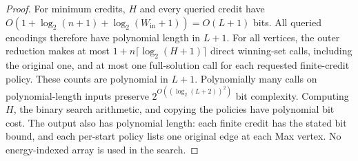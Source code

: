 \begin{proof}
For minimum credits, $H$ and every queried credit have
$O(1+\log_2(n+1)+\log_2(W_{\mathrm{in}}+1))=O(L+1)$ bits. All queried
encodings therefore have polynomial length in $L+1$. For all vertices,
the outer reduction makes at most $1+n\lceil\log_2(H+1)\rceil$ direct
winning-set calls, including the original one, and at most one
full-solution call for each requested finite-credit policy. These
counts are polynomial in
$L+1$. Polynomially many calls on polynomial-length inputs preserve
$2^{O((\log_2(L+2))^2)}$ bit complexity. Computing $H$, the binary
search arithmetic, and copying the policies have polynomial bit cost.
The output also has polynomial length: each finite credit has the
stated bit bound, and each per-start policy lists one original edge
at each Max vertex. No energy-indexed array is used in the search.
\end{proof}
